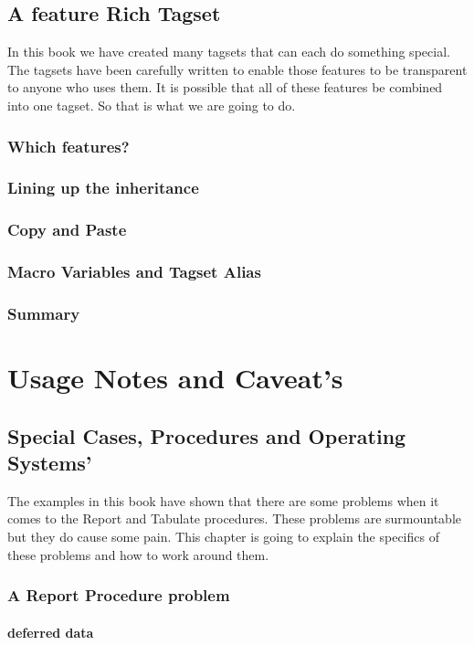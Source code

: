 \documentclass{book}
\begin{document}
\chapter{A feature Rich Tagset}
In this book we have created many tagsets that can each do something special.
The tagsets have been carefully written to enable those features to be
transparent to anyone who uses them.  It is possible that all of these features
be combined into one tagset.  So that is what we are going to do.
\section{Which features?}

\section{Lining up the inheritance}

\section{Copy and Paste}

\section{Macro Variables and Tagset Alias}

\section{Summary}

\part{Usage Notes and Caveat's}
\chapter{Special Cases, Procedures and Operating Systems'}
The examples in this book have shown that there are some problems
when it comes to the Report and Tabulate procedures.  These
problems are surmountable but they do cause some pain.  This
chapter is going to explain the specifics of these problems
and how to work around them.
\section{A Report Procedure problem}

\subsection{deferred data}
\end{document}
